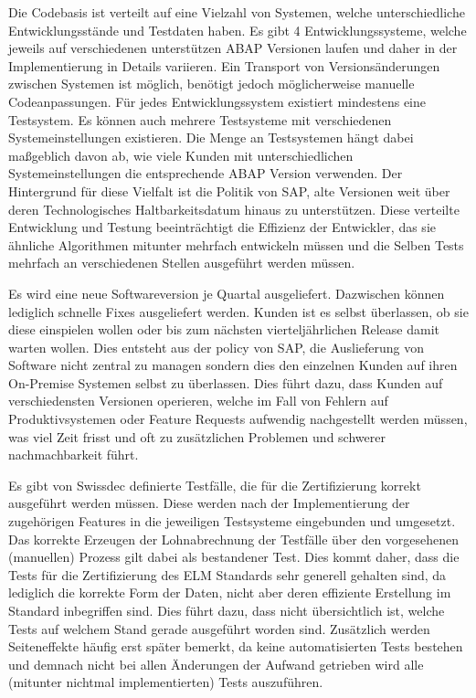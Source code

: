 Die Codebasis ist verteilt auf eine Vielzahl von Systemen, welche unterschiedliche Entwicklungsstände und Testdaten haben. Es gibt 4 Entwicklungssysteme, welche jeweils auf verschiedenen unterstützen ABAP Versionen laufen und daher in der Implementierung in Details variieren. Ein Transport von Versionsänderungen zwischen Systemen ist möglich, benötigt jedoch möglicherweise manuelle Codeanpassungen.
Für jedes Entwicklungssystem existiert mindestens eine Testsystem. Es können auch mehrere Testsysteme mit verschiedenen Systemeinstellungen existieren. Die Menge an Testsystemen hängt dabei maßgeblich davon ab, wie viele Kunden mit unterschiedlichen Systemeinstellungen die entsprechende ABAP Version verwenden.
Der Hintergrund für diese Vielfalt ist die Politik von SAP, alte Versionen weit über deren Technologisches Haltbarkeitsdatum hinaus zu unterstützen. 
Diese verteilte Entwicklung und Testung beeinträchtigt die Effizienz der Entwickler, das sie ähnliche Algorithmen mitunter mehrfach entwickeln müssen und die Selben Tests mehrfach an verschiedenen Stellen ausgeführt werden müssen.

Es wird eine neue Softwareversion je Quartal ausgeliefert. Dazwischen können lediglich schnelle Fixes ausgeliefert werden. Kunden ist es selbst überlassen, ob sie diese einspielen wollen oder bis zum nächsten vierteljährlichen Release damit warten wollen.
Dies entsteht aus der policy von SAP, die Auslieferung von Software nicht zentral zu managen sondern dies den einzelnen Kunden auf ihren On-Premise Systemen selbst zu überlassen.
Dies führt dazu, dass Kunden auf verschiedensten Versionen operieren, welche im Fall von Fehlern auf Produktivsystemen oder Feature Requests aufwendig nachgestellt werden müssen, was viel Zeit frisst und oft zu zusätzlichen Problemen und schwerer nachmachbarkeit führt. 

Es gibt von Swissdec definierte Testfälle, die für die Zertifizierung korrekt ausgeführt werden müssen. Diese werden nach der Implementierung der zugehörigen Features in die jeweiligen Testsysteme eingebunden und umgesetzt. Das korrekte Erzeugen der Lohnabrechnung der Testfälle über den vorgesehenen (manuellen) Prozess gilt dabei als bestandener Test.
Dies kommt daher, dass die Tests für die Zertifizierung des ELM Standards sehr generell gehalten sind, da lediglich die korrekte Form der Daten, nicht aber deren effiziente Erstellung im Standard inbegriffen sind.
Dies führt dazu, dass nicht übersichtlich ist, welche Tests auf welchem Stand gerade ausgeführt worden sind. Zusätzlich werden Seiteneffekte häufig erst später bemerkt, da keine automatisierten Tests bestehen und demnach nicht bei allen Änderungen der Aufwand getrieben wird alle (mitunter nichtmal implementierten) Tests auszuführen. 

